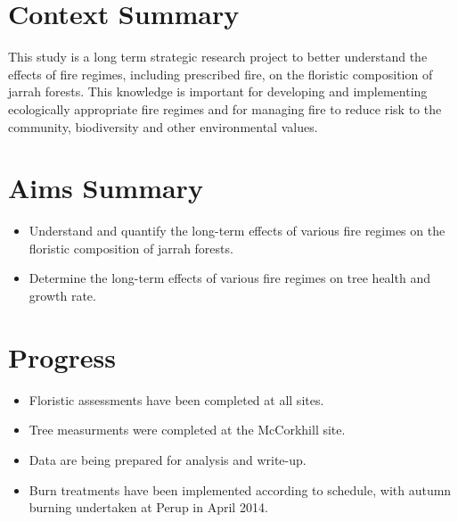 \documentclass[version=last, paper=a4, DIV=18, usenames, dvipsnames]{scrartcl}
\begin{document}
\section{Context Summary}



This study is a long term strategic research project to better understand the effects of fire regimes, including prescribed fire, on the floristic composition of jarrah forests. This knowledge is important for developing and implementing ecologically appropriate fire regimes and for managing fire to reduce risk to the community, biodiversity and other environmental values.






\section{Aims Summary}



\begin{itemize}

  \item Understand and quantify the long-term effects of various fire regimes on the floristic composition of jarrah forests.

  \item Determine the long-term effects of various fire regimes on tree health and growth rate.

\end{itemize}






\section{Progress}



\begin{itemize}

  \item Floristic assessments have been completed at all sites.

  \item Tree measurments were completed at the McCorkhill site.

  \item Data are being prepared for analysis and write-up.

  \item Burn treatments have been implemented according to schedule, with autumn burning undertaken at Perup in April 2014.

\end{itemize}
\end{document}
